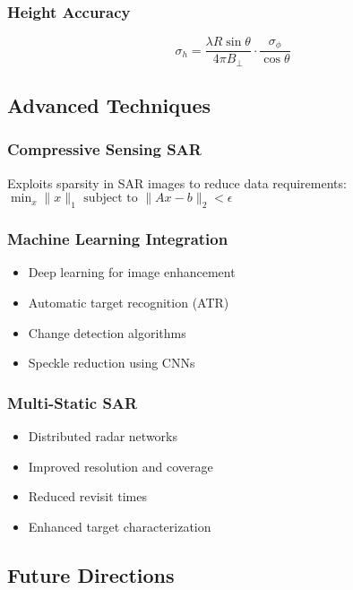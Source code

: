 \documentclass[a0paper,landscape,20pt]{extarticle}
\begin{document}
\begin{multicols}{4}
\subsubsection{Height Accuracy}
$$\sigma_h = \frac{\lambda R \sin\theta}{4\pi B_\perp} \cdot \frac{\sigma_\phi}{\cos\theta}$$


\subsection{Advanced Techniques}

\subsubsection{Compressive Sensing SAR}
Exploits sparsity in SAR images to reduce data requirements:
$\min_x \|x\|_1 \text{ subject to } \|Ax - b\|_2 < \epsilon$

\subsubsection{Machine Learning Integration}
\begin{itemize}
  \item Deep learning for image enhancement
  \item Automatic target recognition (ATR)
  \item Change detection algorithms
  \item Speckle reduction using CNNs
\end{itemize}

\subsubsection{Multi-Static SAR}
\begin{itemize}
  \item Distributed radar networks
  \item Improved resolution and coverage
  \item Reduced revisit times
  \item Enhanced target characterization
\end{itemize}

\subsection{Future Directions}


\end{multicols}
\end{document}
